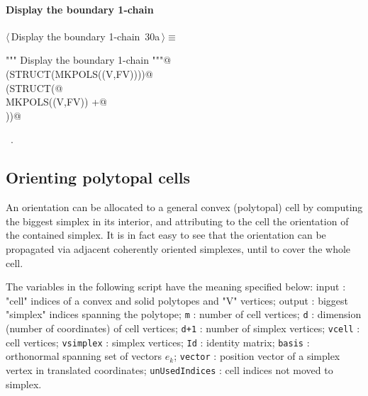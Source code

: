 \documentclass[11pt,oneside]{article}	%
\begin{document}
\paragraph{Display the boundary 1-chain}
\begin{flushleft} \small \label{scrap52}
\protect{}$\langle\,$Display the boundary 1-chain\nobreak\ {\footnotesize 30a}$\,\rangle\equiv$
\vspace{-1ex}
\begin{list}{}{} \item
\mbox{}\verb@""" Display the boundary 1-chain """@\\
\mbox{}\verb@VIEW(STRUCT(MKPOLS((V,FV))))@\\
\mbox{}\verb@VIEW(STRUCT(@\\
\mbox{}\verb@   MKPOLS((V,FV)) +@\\
\mbox{}  ))@\\
\mbox{}\verb@@{\NWsep}
\end{list}
\vspace{-1ex}
\footnotesize\addtolength{\baselineskip}{-1ex}
\begin{list}{}{\setlength{\itemsep}{-\parsep}\setlength{\itemindent}{-\leftmargin}}
\item \NWtxtMacroRefIn\ .
\end{list}
\end{flushleft}



\subsection{Orienting polytopal cells}

An orientation can be allocated to a general convex (polytopal) cell by computing the biggest simplex in its interior, and attributing to the cell the orientation of the contained simplex. 
It is in fact easy to see that the orientation can be propagated via adjacent coherently oriented simplexes, until to cover the whole cell.

The variables in the following script have the meaning specified below:
{input} :  "cell" indices of a convex and solid polytopes and "V" vertices;
{output} :  biggest "simplex" indices spanning the polytope;
{\tt m} : number of cell vertices;
{\tt d} : dimension (number of coordinates) of cell vertices;
{\tt d+1} : number of simplex vertices;
{\tt vcell} : cell vertices;
{\tt vsimplex} : simplex vertices;
{\tt Id} : identity matrix;
{\tt basis} : orthonormal spanning set of vectors $e_k$;
{\tt vector} : position vector of a simplex vertex in translated coordinates;
{\tt unUsedIndices} : cell indices not moved to simplex.
\end{document}
